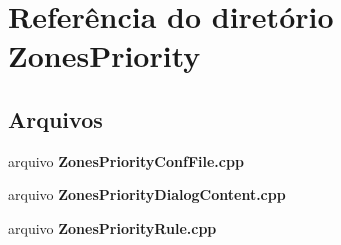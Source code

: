 \section{Referência do diretório Zones\+Priority}
\label{dir_7125c44a398fae88d508cfae200057eb}
\subsection*{Arquivos}
\begin{DoxyCompactItemize}
\item 
arquivo {\bf Zones\+Priority\+Conf\+File.\+cpp}
\item 
arquivo {\bf Zones\+Priority\+Dialog\+Content.\+cpp}
\item 
arquivo {\bf Zones\+Priority\+Rule.\+cpp}
\end{DoxyCompactItemize}
